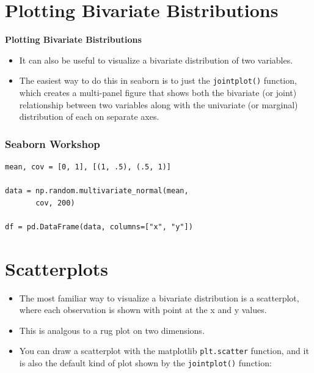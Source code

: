 \documentclass{beamer}
\begin{document}
\section{Plotting Bivariate Bistributions}
\begin{frame}[fragile]
\large
\noindent \textbf{Plotting Bivariate Bistributions}

	\begin{itemize}
\item It can also be useful to visualize a bivariate distribution of two variables. 
\item The easiest way to do this in seaborn is to just the \texttt{jointplot()} function, which creates a multi-panel figure that shows both the bivariate (or joint) relationship between two variables along with the univariate (or marginal) distribution of each on separate axes.
	\end{itemize}


\end{frame}

\begin{frame}[fragile]
	\frametitle{Seaborn Workshop}
	\large
\begin{framed}
\begin{verbatim}
mean, cov = [0, 1], [(1, .5), (.5, 1)]

data = np.random.multivariate_normal(mean, 
       cov, 200)

df = pd.DataFrame(data, columns=["x", "y"])
\end{verbatim}
\end{framed}

\end{frame}
\section{Scatterplots}
\begin{frame}[fragile]
	\large
	\begin{itemize}
\item The most familiar way to visualize a bivariate distribution is a scatterplot, where each observation is shown with point at the x and y values. 
\item This is analgous to a rug plot on two dimensions. 
\item You can draw a scatterplot with the matplotlib \texttt{plt.scatter} function, and it is also the default kind of plot shown by the \texttt{jointplot()} function:
	\end{itemize}


\end{frame}
\end{document}
